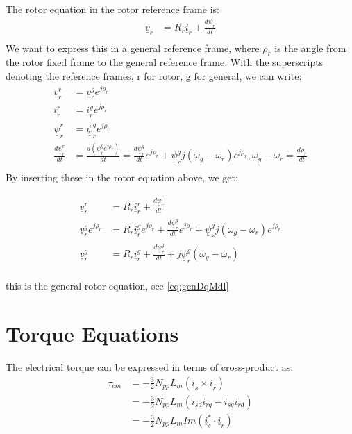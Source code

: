 \documentclass[]{book}
\begin{document}
The rotor equation in the rotor reference frame is:
\[
\begin{aligned}
\underline{v}_r & = R_r \underline{i}_r + \frac{d\underline{\psi}_r}{dt}  \\
\end{aligned}
\label{eq:rotorVoltStat1}
\]
We want to express this in a general reference frame, where \(\rho_r\) is the angle from the rotor fixed frame to the general reference frame. With the superscripts denoting the reference frames, r for rotor, g for general, we can write:
\[
\begin{aligned}
\underline{v}^r_r & = \underline{v}^g_r e^{j\rho_r} \\
\underline{i}^r_r & = \underline{i}^g_r e^{j\rho_r} \\
\underline{\psi}^r_r & = \underline{\psi}^g_r e^{j\rho_r} \\
\frac{d\underline{\psi}^r_r}{dt}  & = \frac{d (\underline{\psi}^g_r e^{j\rho_r} )}{dt}  = 
\frac{d\underline{\psi}^g_r}{dt}  e^{j\rho_r} + \underline{\psi}^g_r j (\omega_g-\omega_r) e^{j\rho_r},
\omega_g-\omega_r = \frac{d\rho_r}{dt} \\
\end{aligned}
\label{eq:rotorVoltStat2}
\]
By inserting these in the rotor equation above, we get:

\[
\begin{aligned}
\underline{v}^r_r & = R_r \underline{i}^r_r + \frac{d\underline{\psi}^r_r}{dt}  \\
\underline{v}^g_r e^{j\rho_r} & = R_r \underline{i}^g_r e^{j\rho_r} + \frac{d\underline{\psi}^g_r}{dt}  e^{j\rho_r} + \underline{\psi}^g_r j (\omega_g-\omega_r) e^{j\rho_r}  \\
\underline{v}^g_r  & = R_r \underline{i}^g_r  + \frac{d\underline{\psi}^g_r}{dt}   + j \underline{\psi}^g_r  (\omega_g-\omega_r)  \\
\end{aligned}
\label{eq:rotorVoltStat3}
\]

this is the general rotor equation, see \eqref{eq:genDqMdl}

\hypertarget{torque-equations}{%
\section{Torque Equations}\label{torque-equations}}

The electrical torque can be expressed in terms of cross-product as:
\[
\begin{aligned}
\tau_{em} &= - \frac{3}{2}N_{pp}L_m(\underline{i}_s  \times \underline{i}_r) \\
&= - \frac{3}{2}N_{pp}L_m(i_{sd}i_{rq} -  i_{sq}i_{rd}) \\
&= - \frac{3}{2}N_{pp}L_m Im(\underline{i}^*_s  \cdot \underline{i}_r) \\
\end{aligned}
\label{eq:torque1}
\]
\end{document}
